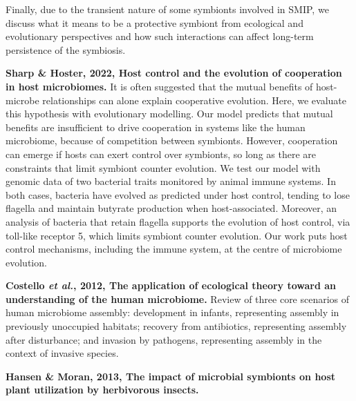 \documentclass[11pt]{article}
\begin{document}
\begin{sloppypar}
Finally, due to the transient nature of some symbionts involved in SMIP, we discuss what it means to be a protective symbiont from ecological and evolutionary perspectives and how such interactions can affect long-term persistence of the symbiosis. 
\par
\textbf{Sharp & Hoster, 2022, Host control and the evolution of cooperation in host microbiomes.} \newline
It is often suggested that the mutual benefits of host-microbe relationships can alone explain cooperative evolution. 
Here, we evaluate this hypothesis with evolutionary modelling. 
Our model predicts that mutual benefits are insufficient to drive cooperation in systems like the human microbiome, because of competition between symbionts. 
However, cooperation can emerge if hosts can exert control over symbionts, so long as there are constraints that limit symbiont counter evolution. 
We test our model with genomic data of two bacterial traits monitored by animal immune systems. 
In both cases, bacteria have evolved as predicted under host control, tending to lose flagella and maintain butyrate production when host-associated. 
Moreover, an analysis of bacteria that retain flagella supports the evolution of host control, via toll-like receptor 5, which limits symbiont counter evolution. 
Our work puts host control mechanisms, including the immune system, at the centre of microbiome evolution. 
\par
\textbf{Costello \textit{et al.}, 2012, The application of ecological theory toward an understanding of the human microbiome.} \newline
Review of three core scenarios of human microbiome assembly: 
development in infants, representing assembly in previously unoccupied habitats; 
recovery from antibiotics, representing assembly after disturbance; 
and invasion by pathogens, representing assembly in the context of invasive species. 
\par
\textbf{Hansen & Moran, 2013, The impact of microbial symbionts on host plant utilization by herbivorous insects.} \newline

\end{sloppypar}
\end{document}
